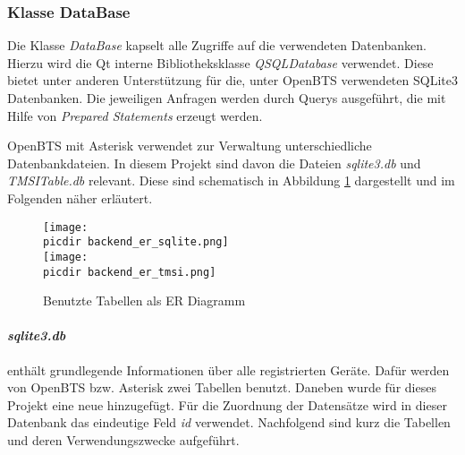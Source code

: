 \subsubsection*{Klasse DataBase}

Die Klasse \textit{DataBase} kapselt alle Zugriffe auf die verwendeten Datenbanken. Hierzu wird die Qt interne Bibliotheksklasse \textit{QSQLDatabase} verwendet. Diese bietet unter anderen Unterstützung für die, unter OpenBTS verwendeten SQLite3 Datenbanken. Die jeweiligen Anfragen werden durch \SQL Querys ausgeführt, die mit Hilfe von \textit{Prepared Statements} erzeugt werden.

OpenBTS mit Asterisk verwendet zur Verwaltung unterschiedliche Datenbankdateien. In diesem Projekt sind davon die Dateien \textit{sqlite3.db} und \textit{TMSITable.db} relevant. Diese sind schematisch in Abbildung \ref{fig:database_er} dargestellt und im Folgenden näher erläutert.

\begin{figure}[h!]
	\centering
	\texttt{[image: \\picdir backend\_er\_sqlite.png]} \\
	\texttt{[image: \\picdir backend\_er\_tmsi.png]}
	\caption{Benutzte Tabellen als ER Diagramm}
	\label{fig:database_er}
\end{figure}


\paragraph{\textit{sqlite3.db}} enthält grundlegende Informationen über alle registrierten Geräte. Dafür werden von OpenBTS bzw. Asterisk zwei Tabellen benutzt. Daneben wurde für dieses Projekt eine neue hinzugefügt. Für die Zuordnung der Datensätze wird in dieser Datenbank das eindeutige Feld \textit{id} verwendet. Nachfolgend sind kurz die Tabellen und deren Verwendungszwecke aufgeführt.

